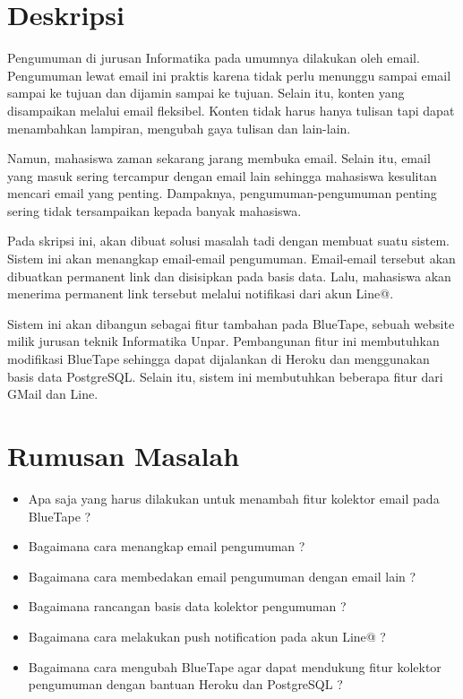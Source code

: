 \documentclass[a4paper,twoside]{article}
\begin{document}
\title{\@judultopik}
\author{\nama \textendash \@npm} 

\newcommand{\nama}{Ellena Angelica}
\newcommand{\@npm}{2015730029}
\newcommand{\@judultopik}{Kolektor Pengumuman Informatika} %
\newcommand{\jumpemb}{1} %
\newcommand{\tanggal}{08/08/2018}
\maketitle


\section{Deskripsi}
Pengumuman di jurusan Informatika pada umumnya dilakukan oleh email. Pengumuman lewat email ini praktis karena tidak perlu menunggu sampai email sampai ke tujuan dan dijamin sampai ke tujuan. Selain itu, konten yang disampaikan melalui email fleksibel. Konten tidak harus hanya tulisan tapi dapat menambahkan lampiran, mengubah gaya tulisan dan lain-lain.

Namun, mahasiswa zaman sekarang jarang membuka email. Selain itu, email yang masuk sering tercampur dengan email lain sehingga mahasiswa kesulitan mencari email yang penting. Dampaknya, pengumuman-pengumuman penting sering tidak tersampaikan kepada banyak mahasiswa.

Pada skripsi ini, akan dibuat solusi masalah tadi dengan membuat suatu sistem. Sistem ini akan menangkap email-email pengumuman. Email-email tersebut akan dibuatkan permanent link dan disisipkan pada basis data. Lalu, mahasiswa akan menerima permanent link tersebut melalui notifikasi dari akun Line@.

Sistem ini akan dibangun sebagai fitur tambahan pada BlueTape, sebuah website milik jurusan teknik Informatika Unpar. Pembangunan fitur ini membutuhkan modifikasi BlueTape sehingga dapat dijalankan di Heroku dan menggunakan basis data PostgreSQL. Selain itu, sistem ini membutuhkan beberapa fitur dari GMail dan Line.

\section{Rumusan Masalah}
\begin{itemize}
\item Apa saja yang harus dilakukan untuk menambah fitur kolektor email pada BlueTape ?
\item Bagaimana cara menangkap email pengumuman ?
\item Bagaimana cara membedakan email pengumuman dengan email lain ?
\item Bagaimana rancangan basis data kolektor pengumuman ?
\item Bagaimana cara melakukan push notification pada akun Line@ ?
\item Bagaimana cara mengubah BlueTape agar dapat mendukung fitur kolektor pengumuman dengan bantuan Heroku dan PostgreSQL ?
\end{itemize}
\end{document}
